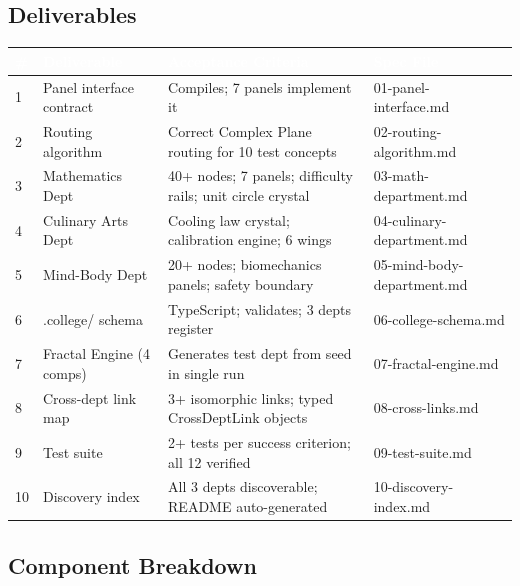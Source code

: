 \documentclass[11pt,letterpaper]{article}
\newcommand{\tableheader}[1]{\textbf{\sffamily\textcolor{white}{#1}}}
\begin{document}
\subsection{Deliverables}

\begin{center}
\begin{tabularx}{\textwidth}{C{0.5cm}L{4cm}L{5cm}L{3cm}}
\toprule
{}
\tableheader{\#} & \tableheader{Deliverable} & \tableheader{Acceptance Criteria} & \tableheader{Spec File} \\
 & Panel interface contract & Compiles; 7 panels implement it & 01-panel-interface.md \\
2 & Routing algorithm & Correct Complex Plane routing for 10 test concepts & 02-routing-algorithm.md \\
3 & Mathematics Dept & 40+ nodes; 7 panels; difficulty rails; unit circle crystal & 03-math-department.md \\
4 & Culinary Arts Dept & Cooling law crystal; calibration engine; 6 wings & 04-culinary-department.md \\
5 & Mind-Body Dept & 20+ nodes; biomechanics panels; safety boundary & 05-mind-body-department.md \\
6 & .college/ schema & TypeScript; validates; 3 depts register & 06-college-schema.md \\
7 & Fractal Engine (4 comps) & Generates test dept from seed in single run & 07-fractal-engine.md \\
8 & Cross-dept link map & 3+ isomorphic links; typed CrossDeptLink objects & 08-cross-links.md \\
9 & Test suite & 2+ tests per success criterion; all 12 verified & 09-test-suite.md \\
10 & Discovery index & All 3 depts discoverable; README auto-generated & 10-discovery-index.md \\
\bottomrule
\end{tabularx}
\end{center}

\subsection{Component Breakdown}
\end{document}
